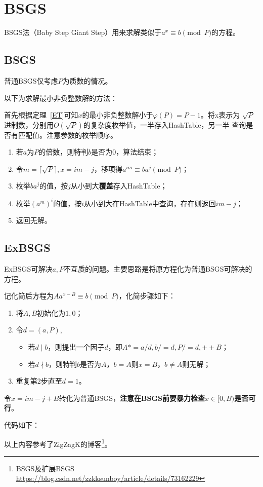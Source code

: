 \section{BSGS}
BSGS法（Baby Step Giant Step）用来求解类似于$a^x\equiv b\pmod{P}$的方程。
\subsection{BSGS}
普通BSGS仅考虑$P$为质数的情况。

以下为求解最小非负整数解的方法：

首先根据定理~\ref{ET}可知$x$的最小非负整数解小于$\varphi(P)=P-1$。将x表示为
$\sqrt{P}$进制数，分别用$O(\sqrt{P})$的复杂度枚举值，一半存入HashTable，另一半
查询是否有匹配值。注意参数的枚举顺序。

\begin{enumerate}
    \item 若$a$为$P$的倍数，则特判$b$是否为$0$，算法结束；
    \item 令$m=\lceil\sqrt{P}\rceil,x=im-j$，移项得$a^{im}\equiv ba^j\pmod{P}$；
    \item 枚举$ba^j$的值，按$j$从小到大{\bfseries 覆盖}存入HashTable；
    \item 枚举$(a^m)^i$的值，按$i$从小到大在HashTable中查询，存在则返回$im-j$；
    \item 返回无解。
\end{enumerate}

\subsection{ExBSGS}
ExBSGS可解决$a,P$不互质的问题。主要思路是将原方程化为普通BSGS可解决的方程。

记化简后方程为$Aa^{x-B}\equiv b\pmod{P}$，化简步骤如下：
\begin{enumerate}
    \item 将$A,B$初始化为$1,0$；
    \item 令$d=(a,P)$,
    \begin{itemize}
        \item 若$d\mid b$，则提出一个因子$d$，即$A*=a/d,b/=d,P/=d,++B$；
        \item 若$d\nmid b$，则特判$b$是否为$A$，$b=A$则$x=B$，$b\neq A$则无解；
    \end{itemize}
    \item 重复第2步直至$d=1$。
\end{enumerate}
令$x=im-j+B$转化为普通BSGS，{\bfseries 注意在BSGS前要暴力检查$x\in[0,B)$是否可行}。

代码如下：


以上内容参考了ZigZagK的博客\footnote{BSGS及扩展BSGS
\url{https://blog.csdn.net/zzkksunboy/article/details/73162229}}。
